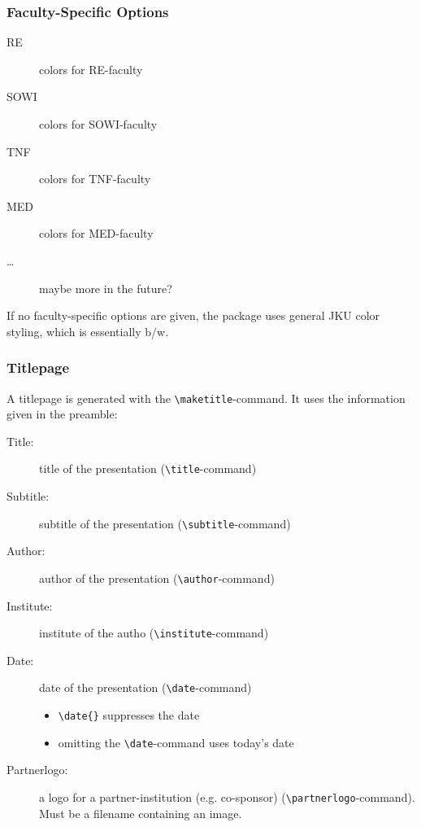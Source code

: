 \documentclass[aspectratio=169]{beamer}
\begin{document}

\begin{frame}[fragile]
\frametitle{Faculty-Specific Options}

\begin{description}
 \item[RE] colors for RE-faculty
 \item[SOWI] colors for SOWI-faculty
 \item[TNF] colors for TNF-faculty
 \item[MED] colors for MED-faculty
 \item[\ldots] maybe more in the future?
\end{description}

If no faculty-specific options are given,
the package uses general JKU color styling, which is essentially b/w.
\end{frame}


\begin{frame}[fragile]
\frametitle{Titlepage}

A titlepage is generated with the \verb+\maketitle+-command. It uses the information given in the preamble:
 \begin{description}
  \item[Title:] title of the presentation (\verb+\title+-command)
  \item[Subtitle:] subtitle of the presentation (\verb+\subtitle+-command)
  \item[Author:] author of the presentation (\verb+\author+-command)
  \item[Institute:] institute of the autho (\verb+\institute+-command)
  \item[Date:] date of the presentation (\verb+\date+-command)
  \begin{itemize}
   \item \verb+\date{}+ suppresses the date
   \item omitting the \verb+\date+-command uses today's date
  \end{itemize}
  \item[Partnerlogo:] a logo for a partner-institution (e.g. co-sponsor) (\verb+\partnerlogo+-command). Must be a filename containing an image.

 \end{description}
\end{frame}
\end{document}
